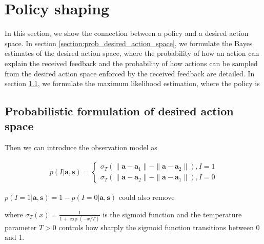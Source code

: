 \section{Policy shaping}
\label{sec:Policy_shaping}


In this section, we show the connection between a policy and a desired action space.
In section \ref{section:prob_desired_action_space}, we formulate the Bayes estimates of the desired action space, where the probability of how an action can explain the received feedback and the probability of how actions can be sampled from the desired action space enforced by the received feedback are detailed.
In section \ref{},
we formulate the maximum likelihood estimation, where the policy is 






\subsection{Probabilistic formulation of desired action space}

Then we can introduce the observation model as

\begin{align*}
    p (I | \bm a, \bm s) =   \left\{ {\begin{array}{*{20}{c}}
	 \sigma_T(\| \bm a- \bm a_1\| - \| \bm a- \bm a_2\|), I = 1\\
	 \sigma_T(\| \bm a- \bm a_2\| - \| \bm a- \bm a_1\|), I = 0
	\end{array}} \right. 
\end{align*}

$p (I  = 1| \bm a, \bm s) = 1-p (I=0 | \bm a, \bm s)$ could also remove 

where $\sigma_T(x) = \frac{1}{1 + \exp (- x/T)}$ is the sigmoid function and the temperature parameter $T > 0$ controls how sharply the sigmoid function transitions between 0 and 1. 

